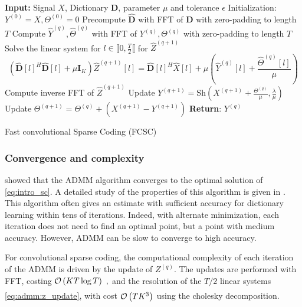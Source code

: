 \documentclass[../thesis.tex]{subfiles}
\begin{document}
\begin{algorithm}[t]
\begin{algorithmic}[1]

	\STATE \textbf{Input: } Signal $X$, Dictionary $\pmb D$, parameter $\mu$
						 and tolerance $\epsilon$
	\STATE Initialization: $Y^{(0)} = X, \Theta^{(0)} = 0$
	\STATE Precompute $\widehat{\pmb D}$ with  FFT of $\pmb D$ with zero-padding to length $T$
	\REPEAT
	\STATE Compute $\widehat Y^{(q)}, \widehat \Theta^{(q)}$ with FFT of
		   $Y^{(q)}, \Theta^{(q)}$  with zero-padding to length $T$
	\STATE Solve the linear system for $l \in \llbracket 0, \frac{T}{2}\llbracket$ for $\widehat Z^{(q+1)}$ 
	\[
		\left(\widehat {\pmb D}[l]^{H}\widehat {\pmb D}[l] + \mu \pmb I_K\right)\widehat Z^{(q+1)}[l] =
		\widehat {\pmb D}[l]^H \widehat X[l] + \mu \left(\widehat Y^{(q)}[l] + \frac{\widehat \Theta^{(q)}[l]}{\mu}\right)
	\]
	\STATE Compute inverse FFT of $\widehat Z^{(q+1)}$ 
	\STATE Update $\displaystyle Y^{(q+1)} = \text{Sh}\left(X^{(q+1)} + \frac{\Theta^{(q)}}{\mu},
														    \frac{\lambda}{\mu}\right)$
	\STATE Update $\displaystyle \Theta^{(q+1)} = \Theta^{(q)} + \left(X^{(q+1)} - Y^{(q+1)}\right)$
	\STATE \textbf{Return}: $Y^{(q)}$

\end{algorithmic}
\caption{Fast convolutional Sparse Coding (FCSC)}
\label{alg:admm_sc}
\end{algorithm}



\subsubsection{Convergence and complexity}
\label{par:cvg_admm}


	\citet{Gabay1976} showed that the ADMM algorithm converges to the optimal
	solution of \autoref{eq:intro_sc}. A detailed study of the properties of this
	algorithm is given in \citet{Boyd2010}. This algorithm often gives an estimate
	with sufficient accuracy for dictionary learning within tens of iterations.
	Indeed, with alternate minimization, each iteration does not need to find an
	optimal point, but a point with medium accuracy. However, ADMM can be slow to
	converge to high accuracy.

	For convolutional sparse coding, the computational complexity of each iteration
	of the ADMM is driven by the update of $Z^{(q)}$. The updates are performed
	with FFT, costing $\underset{}{\mathcal O}\left(KT\log{T}\right)~,$ and the resolution of the $T/2$ linear
	systems \autoref{eq:admm:z_update}, with cost $\underset{}{\mathcal O}\left(TK^{3}\right)$ using the cholesky
	decomposition. 
	
\end{document}
